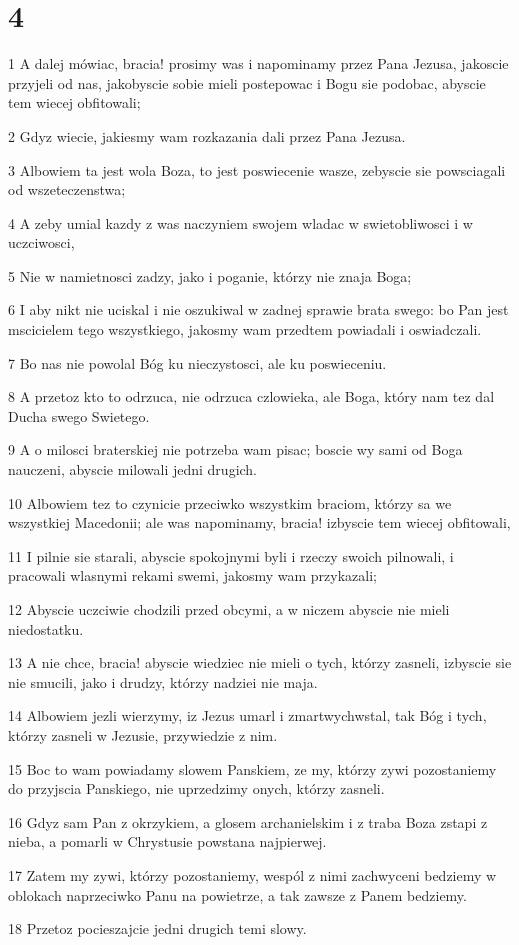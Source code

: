 \chapter{4}

\par 1 A dalej mówiac, bracia! prosimy was i napominamy przez Pana Jezusa, jakoscie przyjeli od nas, jakobyscie sobie mieli postepowac i Bogu sie podobac, abyscie tem wiecej obfitowali;
\par 2 Gdyz wiecie, jakiesmy wam rozkazania dali przez Pana Jezusa.
\par 3 Albowiem ta jest wola Boza, to jest poswiecenie wasze, zebyscie sie powsciagali od wszeteczenstwa;
\par 4 A zeby umial kazdy z was naczyniem swojem wladac w swietobliwosci i w uczciwosci,
\par 5 Nie w namietnosci zadzy, jako i poganie, którzy nie znaja Boga;
\par 6 I aby nikt nie uciskal i nie oszukiwal w zadnej sprawie brata swego: bo Pan jest mscicielem tego wszystkiego, jakosmy wam przedtem powiadali i oswiadczali.
\par 7 Bo nas nie powolal Bóg ku nieczystosci, ale ku poswieceniu.
\par 8 A przetoz kto to odrzuca, nie odrzuca czlowieka, ale Boga, który nam tez dal Ducha swego Swietego.
\par 9 A o milosci braterskiej nie potrzeba wam pisac; boscie wy sami od Boga nauczeni, abyscie milowali jedni drugich.
\par 10 Albowiem tez to czynicie przeciwko wszystkim braciom, którzy sa we wszystkiej Macedonii; ale was napominamy, bracia! izbyscie tem wiecej obfitowali,
\par 11 I pilnie sie starali, abyscie spokojnymi byli i rzeczy swoich pilnowali, i pracowali wlasnymi rekami swemi, jakosmy wam przykazali;
\par 12 Abyscie uczciwie chodzili przed obcymi, a w niczem abyscie nie mieli niedostatku.
\par 13 A nie chce, bracia! abyscie wiedziec nie mieli o tych, którzy zasneli, izbyscie sie nie smucili, jako i drudzy, którzy nadziei nie maja.
\par 14 Albowiem jezli wierzymy, iz Jezus umarl i zmartwychwstal, tak Bóg i tych, którzy zasneli w Jezusie, przywiedzie z nim.
\par 15 Boc to wam powiadamy slowem Panskiem, ze my, którzy zywi pozostaniemy do przyjscia Panskiego, nie uprzedzimy onych, którzy zasneli.
\par 16 Gdyz sam Pan z okrzykiem, a glosem archanielskim i z traba Boza zstapi z nieba, a pomarli w Chrystusie powstana najpierwej.
\par 17 Zatem my zywi, którzy pozostaniemy, wespól z nimi zachwyceni bedziemy w oblokach naprzeciwko Panu na powietrze, a tak zawsze z Panem bedziemy.
\par 18 Przetoz pocieszajcie jedni drugich temi slowy.

